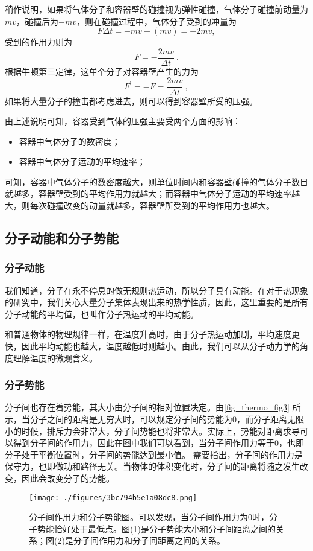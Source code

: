稍作说明，如果将气体分子和容器壁的碰撞视为弹性碰撞，气体分子碰撞前动量为$mv$，碰撞后为$-mv$，则在碰撞过程中，气体分子受到的冲量为$$F\Delta t=-mv-(mv)=-2mv,$$受到的作用力则为
$$F=-\dfrac{2mv}{\Delta t}~.$$
根据牛顿第三定律，这单个分子对容器壁产生的力为
$$F^\prime=-F=\dfrac{2mv}{\Delta t}~,$$
如果将大量分子的撞击都考虑进去，则可以得到容器壁所受的压强。

由上述说明可知，容器受到气体的压强主要受两个方面的影响：
\begin{itemize}
\item 容器中气体分子的数密度；
\item 容器中气体分子运动的平均速率；
\end{itemize}
可知，容器中气体分子的数密度越大，则单位时间内和容器壁碰撞的气体分子数目就越多，容器壁受到的平均作用力就越大；而容器中气体分子运动的平均速率越大，则每次碰撞改变的动量就越多，容器壁所受到的平均作用力也越大。
\subsection{分子动能和分子势能}
\subsubsection{分子动能}
我们知道，分子在永不停息的做无规则热运动，所以分子具有动能。在对于热现象的研究中，我们关心大量分子集体表现出来的热学性质，因此，这里重要的是所有分子动能的平均值，也叫作分子热运动的平均动能。

和普通物体的物理规律一样，在温度升高时，由于分子热运动加剧，平均速度更快，因此平均动能也越大，温度越低时则越小。由此，我们可以从分子动力学的角度理解温度的微观含义。

\subsubsection{分子势能}
分子间也存在着势能，其大小由分子间的相对位置决定。由\autoref{fig_thermo_fig3} 所示，当分子之间的距离是无穷大时，可以规定分子间的势能为$0$，而分子距离无限小的时候，排斥力会非常大，分子间势能也将非常大。实际上，势能对距离求导可以得到分子间的作用力，因此在图中我们可以看到，当分子间作用力等于$0$，也即分子处于平衡位置时，分子间的势能达到最小值。
需要指出，分子间的作用力是保守力，也即做功和路径无关。当物体的体积变化时，分子间的距离将随之发生改变，因此会改变分子的势能。

\begin{figure}[ht]
\centering
\texttt{[image: ./figures/3bc794b5e1a08dc8.png]}
\caption{分子间作用力和分子势能图。可以发现，当分子间作用力为$0$时，分子势能恰好处于最低点。图(1)是分子势能大小和分子间距离之间的关系；图(2)是分子间作用力和分子间距离之间的关系。} \label{fig_thermo_fig3}
\end{figure}


